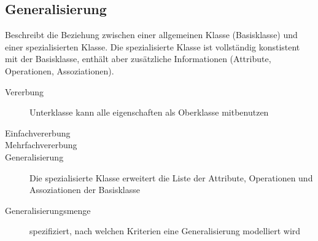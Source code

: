 \subsection{Generalisierung}
Beschreibt die Beziehung zwischen einer allgemeinen Klasse (Basisklasse) und
einer spezialisierten Klasse. Die spezialisierte Klasse ist vollständig
konstistent mit der Basisklasse, enthält aber zusätzliche Informationen
(Attribute, Operationen, Assoziationen).
	\begin{description}
		\item[Vererbung] Unterklasse kann alle eigenschaften als Oberklasse
		mitbenutzen
		\item[Einfachvererbung]
		\item[Mehrfachvererbung]
		\item[Generalisierung] Die spezialisierte Klasse erweitert die Liste der
		Attribute, Operationen und Assoziationen der Basisklasse
		\item[Generalisierungsmenge] spezifiziert, nach welchen Kriterien eine
		Generalisierung modelliert wird
	\end{description}
	
